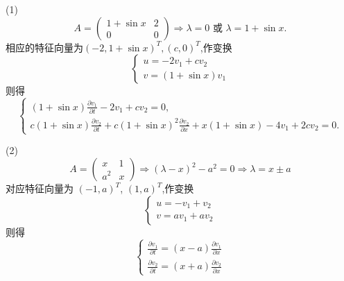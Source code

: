 \begin{solve}
  (1) \[A = \begin{pmatrix}
  1+\sin x&2\\0&0\end{pmatrix}\Rightarrow\lambda=0\text{\ 或\ }\lambda=1+\sin x.\]
  相应的特征向量为$(-2,1+\sin x)^T,(c,0)^T$,作变换
  \[\begin{cases}
  u=-2v_1+cv_2\\
  v=(1+\sin x)v_1
  \end{cases}\]
  则得
  \[\begin{cases}
  (1+\sin x)\frac{\partial v_1}{\partial t}-2v_1+cv_2=0, \\
  c(1+\sin x)\frac{\partial v_2}{\partial t}+c(1+\sin x)^2\frac{\partial v_2}{\partial x}
    + x(1+\sin x)-4v_1+2cv_2=0.
  \end{cases}\]

  (2) \[A=\begin{pmatrix}
        x & 1 \\ a^2 & x
  \end{pmatrix}\Rightarrow(\lambda-x)^2-a^2=0\Rightarrow\lambda=x\pm a\]
  对应特征向量为 $(-1,a)^T$, $(1,a)^T$,作变换
  \[\begin{cases}
  u=-v_1+v_2\\
  v=av_1+av_2
  \end{cases}\]
  则得
  \[\begin{cases}
  \frac{\partial v_1}{\partial t}=(x-a)\frac{\partial v_1}{\partial x}\\
  \frac{\partial v_2}{\partial t}=(x+a)\frac{\partial v_2}{\partial x}
  \end{cases}\]


\end{solve}

